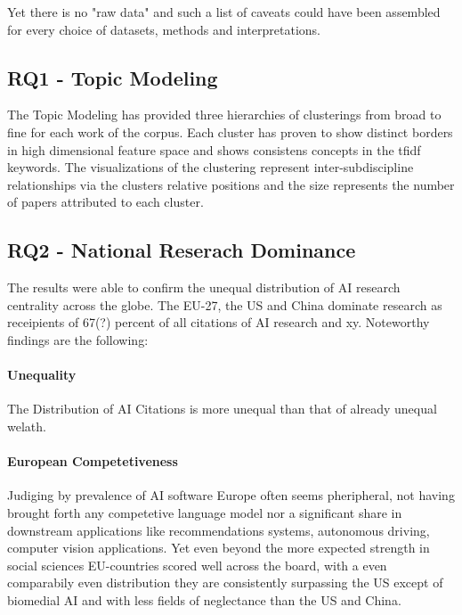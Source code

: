\documentclass{article}
\begin{document}
Yet there is no "raw data" and such a list of caveats could have been assembled for every choice of datasets, methods and interpretations.

\subsection{RQ1 - Topic Modeling}

The Topic Modeling has provided three hierarchies of clusterings from broad to fine for each work of the corpus. Each cluster has proven to show distinct borders in high dimensional feature space and shows consistens concepts in the tfidf keywords. The visualizations of the clustering represent inter-subdiscipline relationships via the clusters relative positions and the size represents the number of papers attributed to each cluster. 

\subsection{RQ2 - National Reserach Dominance}

The results were able to confirm the unequal distribution of AI research centrality across the globe. The EU-27, the US and China dominate research as receipients of 67(?) percent of all citations of AI research and xy. Noteworthy findings are the following:

\paragraph{Unequality} The Distribution of AI Citations is more unequal than that of already unequal welath.

\paragraph{European Competetiveness} Judiging by prevalence of AI software Europe often seems pheripheral, not having brought forth any competetive language model nor a significant share in downstream applications like recommendations systems, autonomous driving, computer vision applications. Yet even beyond the more expected strength in social sciences EU-countries scored well across the board, with a even comparabily even distribution they are consistently surpassing the US except of biomedial AI and with less fields of neglectance than the US and China. 
\end{document}
